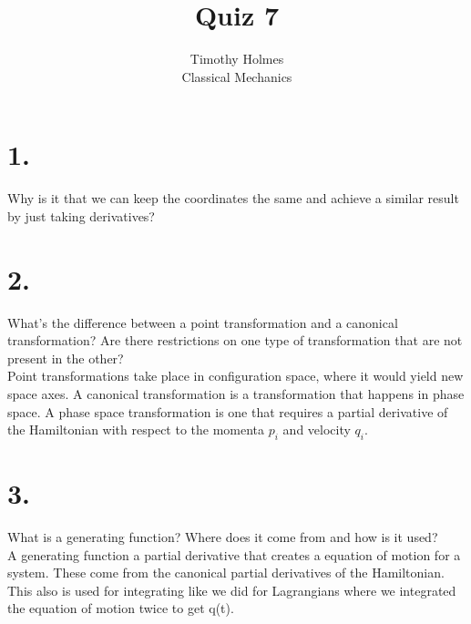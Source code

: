 \documentclass[12pt]{article}
\begin{document}
 
 
\title{Quiz 7}
\author{Timothy Holmes\\ %
Classical Mechanics}

\maketitle

\section*{1.}

Why is it that we can keep the coordinates the same and achieve a similar result by just taking derivatives?


\section*{2.}
What's the difference between a point transformation and a canonical transformation? Are
there restrictions on one type of transformation that are not present in the other? \\

Point transformations take place in configuration space, where it would yield new space axes. A canonical transformation is a transformation that happens in phase space. A phase space transformation is one that requires a partial derivative of the Hamiltonian with respect to the momenta $p_{i}$ and velocity $q_{i}$.

\section*{3.}
What is a generating function? Where does it come from and how is it used? \\

A generating function a partial derivative that creates a equation of motion for a system. These come from the canonical partial derivatives of the Hamiltonian. This also is used for integrating like we did for Lagrangians where we integrated the equation of motion twice to get q(t).
 
\end{document}
